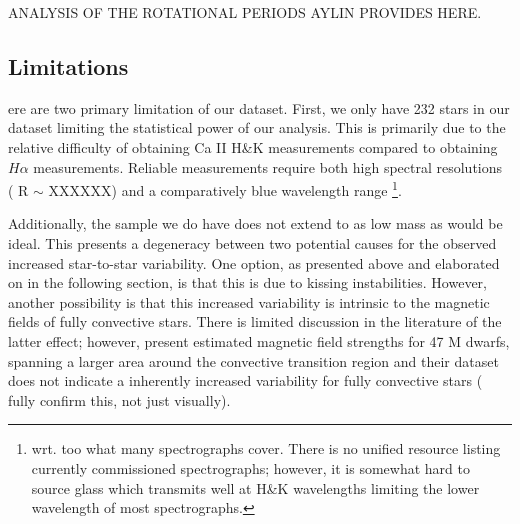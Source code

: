 {\color{red} ANALYSIS OF THE ROTATIONAL PERIODS AYLIN PROVIDES HERE.}

\subsection{Limitations} ere are two primary limitation of our dataset. First,
we only have {\color{red}232 stars} in our dataset limiting the statistical
power of our analysis. This is primarily due to the relative difficulty of
obtaining Ca II H\&K measurements compared to obtaining $H\alpha$ measurements.
Reliable measurements require both high spectral resolutions ({\color{red} R
$\sim$ XXXXXX}) and a comparatively blue wavelength range \footnote{wrt. too what
many spectrographs cover. There is no unified resource listing currently commissioned spectrographs; however, it is somewhat hard to source glass which transmits well at H\&K wavelengths limiting the lower wavelength of most spectrographs.}.

Additionally, the sample we do have does not extend to as low mass as would be ideal. This presents a degeneracy between two potential causes for the observed increased star-to-star variability. One option, as presented above and elaborated on in the following section, is that this is due to kissing instabilities. However, another possibility is that this increased variability is intrinsic to the magnetic fields of fully convective stars. There is limited discussion in the literature of the latter effect; however, \citet{Shulyak2019} present estimated magnetic field strengths for 47 M dwarfs, spanning a larger area around the convective transition region and their dataset does not indicate a inherently increased variability for fully convective stars ({\color{red} fully confirm this, not just visually}).
